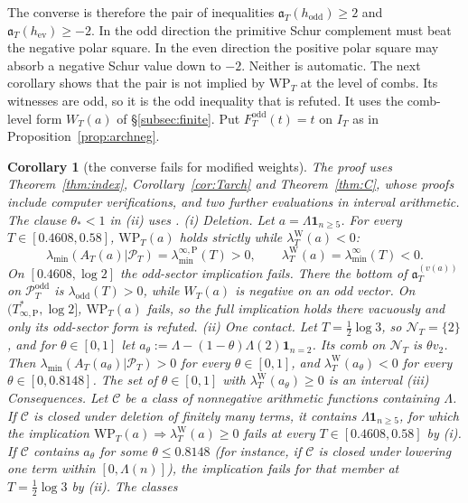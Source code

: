 \documentclass[11pt]{amsart}
\newtheorem{corollary}[theorem]{Corollary}
\theoremstyle{definition}
\theoremstyle{remark}
\newcommand{\PT}{\mathcal P_T}
\newcommand{\IT}{I_T}
\newcommand{\NT}{\mathcal N_T}
\newcommand{\laminf}{\lambda^{\infty}_{\min}}
\newcommand{\laminfP}{\lambda^{\infty,\mathrm P}_{\min}}
\begin{document}
The converse is therefore the pair of inequalities $\mathfrak a_T(h_{\mathrm{odd}})\ge2$ and
$\mathfrak a_T(h_{\mathrm{ev}})\ge-2$. In the odd direction the primitive Schur complement must beat the negative
polar square. In the even direction the positive polar square may absorb a negative Schur value down
to $-2$. Neither is automatic. The next corollary shows that the pair is not implied by $\mathrm{WP}_T$ at the level of combs. Its witnesses are odd, so it is the odd inequality that is refuted.
It uses the comb-level form $W_T(a)$ of \S\ref{subsec:finite}. Put $F^{\mathrm{odd}}_T(t)=t$ on $\IT$ as in
Proposition~\ref{prop:archneg}.

\begin{corollary}[the converse fails for modified weights]\label{cor:convfail}
The proof uses Theorem~\ref{thm:index}, Corollary~\ref{cor:Tarch} and Theorem~\ref{thm:C}, whose proofs include
computer verifications, and two further evaluations in interval arithmetic. The clause $\theta_*<1$ in (ii)
uses \cite[Thm.~1.2]{Zhu2026}.
\emph{(i) Deletion.} Let $a=\Lambda\mathbf 1_{n\ge5}$. For every $T\in[0.4608,0.58]$, $\mathrm{WP}_T(a)$ holds
strictly while $\lambda^{\mathrm W}_T(a)<0$:
\[
\lambda_{\min}(A_T(a)|\PT)=\laminfP(T)>0,\qquad\lambda^{\mathrm W}_T(a)=\laminf(T)<0 .
\]
On $[0.4608,\log2]$ the odd-sector implication fails. There the bottom of $\mathfrak a^{(v(a))}_T$ on $\PT^{\mathrm{odd}}$ is
$\lambda_{\mathrm{odd}}(T)>0$, while $W_T(a)$ is negative on an odd vector. On $(T^*_{\infty,\mathrm P},\log2]$,
$\mathrm{WP}_T(a)$ fails, so the full implication holds there vacuously and only its odd-sector form is refuted.
\emph{(ii) One contact.} Let $T=\frac12\log3$, so $\NT=\{2\}$, and for $\theta\in[0,1]$ let
$a_\theta:=\Lambda-(1-\theta)\Lambda(2)\mathbf 1_{n=2}$. Its comb on $\NT$ is $\theta v_2$. Then
$\lambda_{\min}(A_T(a_\theta)|\PT)>0$ for every $\theta\in[0,1]$, and $\lambda^{\mathrm W}_T(a_\theta)<0$ for every
$\theta\in[0,0.8148]$. The set of $\theta\in[0,1]$ with $\lambda^{\mathrm W}_T(a_\theta)\ge0$ is an interval
\emph{(iii) Consequences.} Let $\mathcal C$ be a class of nonnegative arithmetic functions containing $\Lambda$.
If $\mathcal C$ is closed under deletion of finitely many terms, it contains $\Lambda\mathbf 1_{n\ge5}$, for which
the implication $\mathrm{WP}_T(a)\Rightarrow\lambda^{\mathrm W}_T(a)\ge0$ fails at every $T\in[0.4608,0.58]$ by (i). If
$\mathcal C$ contains $a_\theta$ for some $\theta\le0.8148$ (for instance, if $\mathcal C$ is closed under lowering
one term within $[0,\Lambda(n)]$), the implication fails for that member at $T=\frac12\log3$ by (ii). The classes

\end{corollary}
\end{document}
